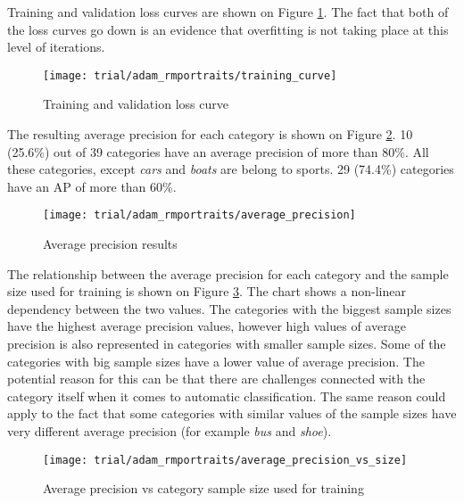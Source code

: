     Training and validation loss curves are shown on Figure \ref{fig:trial-training-curve}. The fact that both of the loss curves go down is an evidence that overfitting is not taking place at this level of iterations.
    
    \begin{figure}[ht!]
        \centering
        \texttt{[image: trial/adam\_rmportraits/training\_curve]}
        \caption[Trial experiment. Training and validation loss curve]{Training and validation loss curve}
        \label{fig:trial-training-curve}
    \end{figure}
    
    The resulting average precision for each category is shown on Figure \ref{fig:trial-average-precision}. 10 (25.6\%) out of 39 categories have an average precision of more than 80\%. All these categories, except \textit{cars} and \textit{boats} are belong to sports. 29 (74.4\%) categories have an AP of more than 60\%.

    \begin{figure}[ht!]
        \centering
        \texttt{[image: trial/adam\_rmportraits/average\_precision]}
        \caption[Trial experiment. Average precision results]{Average precision results}
        \label{fig:trial-average-precision}
    \end{figure}
    
    The relationship between the average precision for each category and the sample size used for training is shown on Figure \ref{fig:trial-average-precision-vs-size}. The chart shows a non-linear dependency between the two values. The categories with the biggest sample sizes have the highest average precision values, however high values of average precision is also represented in categories with smaller sample sizes. Some of the categories with big sample sizes have a lower value of average precision. The potential reason for this can be that there are challenges connected with the category itself when it comes to automatic classification. The same reason could apply to the fact that some categories with similar values of the sample sizes have very different average precision (for example \textit{bus} and \textit{shoe}).
    
    \begin{figure}[H]
        \centering
        \texttt{[image: trial/adam\_rmportraits/average\_precision\_vs\_size]}
        \caption[Trial experiment. Average precision vs category sample size used for training]{Average precision vs category sample size used for training}
        \label{fig:trial-average-precision-vs-size}
    \end{figure}
    
